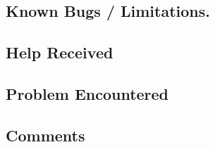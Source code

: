 \documentclass[11pt,a4paper,notitlepage]{article}
\newcommand{\explanation}[1]{}  %
\begin{document}
 
\subsection{Known Bugs / Limitations.}
\explanation{Known bugs / limitations. For example, if your program prints
  out different representations of the same line segment when there
 are 5 or more points on a line segment, indicate that here.}

\subsection{Help Received}
\explanation{
Describe whatever help (if any) that you received.
Don't include readings, lectures, and classes, but do
include any help from people (including course staff, lab TAs,
classmates, and friends) and attribute them by name.}


\subsection{Problem Encountered}
\explanation{
Describe any serious problems you encountered.                    }



\subsection{Comments}
\explanation{
List any other comments here. Feel free to provide any feedback   
on how much you learned from doing the assignment, and whether    
you enjoyed doing it.}
\end{document}
